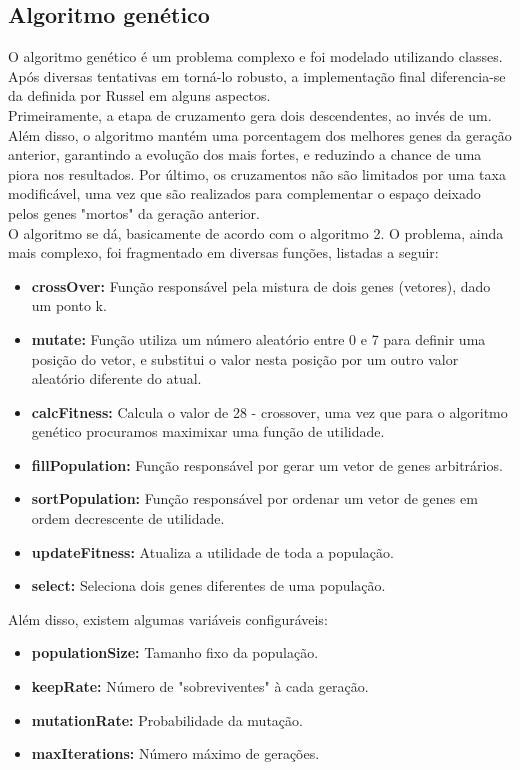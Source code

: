 \documentclass[conference]{IEEEtran}
\begin{document}
\subsection{Algoritmo genético}
O algoritmo genético é um problema complexo e foi modelado utilizando classes. Após diversas tentativas em torná-lo
robusto, a implementação final diferencia-se da definida por Russel\cite{norvig2014inteligencia} em alguns aspectos.\\
Primeiramente, a etapa de cruzamento gera dois descendentes, ao invés de um. Além disso, o algoritmo mantém uma porcentagem dos melhores genes da geração anterior, garantindo a evolução dos mais fortes, e reduzindo a chance de uma piora nos resultados. Por último, os cruzamentos não são limitados por uma taxa modificável, uma vez que são realizados para complementar o espaço deixado pelos genes "mortos" da geração anterior.\\
O algoritmo se dá, basicamente de acordo com o algoritmo 2. O problema, ainda mais complexo, foi fragmentado em diversas funções, listadas a seguir:
\begin{itemize}
	\item \textbf{crossOver:} Função responsável pela mistura de dois genes (vetores), dado um ponto k.
	\item \textbf{mutate:} Função utiliza um número aleatório entre 0 e 7 para definir uma posição do vetor, e substitui o valor nesta posição por um outro valor aleatório diferente do atual.
	\item \textbf{calcFitness:} Calcula o valor de 28 - crossover, uma vez que para o algoritmo genético procuramos maximixar uma função de utilidade.
	\item \textbf{fillPopulation:} Função responsável por gerar um vetor de genes arbitrários.
	\item \textbf{sortPopulation:} Função responsável por ordenar um vetor de genes em ordem decrescente de utilidade.
	\item \textbf{updateFitness:} Atualiza a utilidade de toda a população.	
	\item \textbf{select:} Seleciona dois genes diferentes de uma população.
\end{itemize}

Além disso, existem algumas variáveis configuráveis:

\begin{itemize}
	\item \textbf{populationSize:} Tamanho fixo da população.
	\item \textbf{keepRate:} Número de "sobreviventes" à cada geração.
	\item \textbf{mutationRate:} Probabilidade da mutação.
	\item \textbf{maxIterations:} Número máximo de gerações.
\end{itemize}
\end{document}
